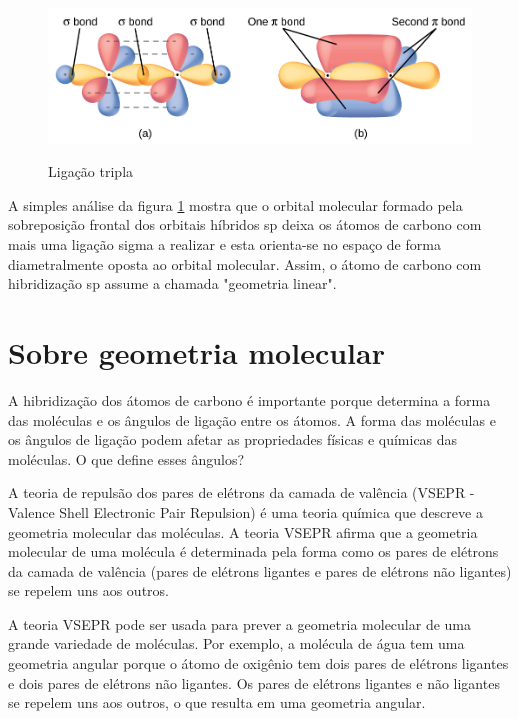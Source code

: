 \documentclass[a4paper,12pt]{book}
\begin{document}
\begin{figure}[h]
	\centering
	\caption{Ligação tripla}
	\vspace{0.5cm}
	\includegraphics[width=0.85\linewidth]{imagens/triplebond.jpeg}
	\label{fig:ligacaotripla2}
\end{figure}

A simples análise da figura \ref*{fig:ligacaotripla2} mostra que o orbital molecular formado pela sobreposição frontal dos orbitais híbridos sp deixa os átomos de carbono com mais uma ligação sigma a realizar e esta orienta-se no espaço de forma diametralmente oposta ao orbital molecular. Assim, o átomo de carbono com hibridização sp assume a chamada "geometria linear".

\section{Sobre geometria molecular}
A hibridização dos átomos de carbono é importante porque determina a forma das moléculas e os ângulos de ligação entre os átomos. A forma das moléculas e os ângulos de ligação podem afetar as propriedades físicas e químicas das moléculas. O que define esses ângulos?

A teoria de repulsão dos pares de elétrons da camada de valência (VSEPR - Valence Shell Electronic Pair Repulsion) é uma teoria química que descreve a geometria molecular das moléculas. A teoria VSEPR afirma que a geometria molecular de uma molécula é determinada pela forma como os pares de elétrons da camada de valência (pares de elétrons ligantes e pares de elétrons não ligantes) se repelem uns aos outros.

A teoria VSEPR pode ser usada para prever a geometria molecular de uma grande variedade de moléculas. Por exemplo, a molécula de água tem uma geometria angular porque o átomo de oxigênio tem dois pares de elétrons ligantes e dois pares de elétrons não ligantes. Os pares de elétrons ligantes e não ligantes se repelem uns aos outros, o que resulta em uma geometria angular.
\end{document}
